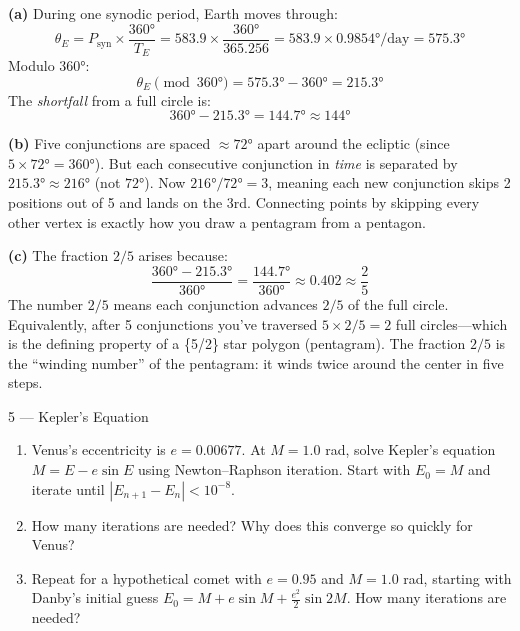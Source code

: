 \documentclass[11pt,letterpaper]{article}
\begin{document}
\begin{solution}
\textbf{(a)} During one synodic period, Earth moves through:
\[
  \theta_E = P_\text{syn} \times \frac{360°}{T_E}
  = 583.9 \times \frac{360°}{365.256}
  = 583.9 \times 0.9854°/\text{day}
  = 575.3°
\]
Modulo $360°$:
\[
  \theta_E \pmod{360°} = 575.3° - 360° = \boxed{215.3°}
\]
The \textit{shortfall} from a full circle is:
\[
  360° - 215.3° = \boxed{144.7° \approx 144°}
\]

\textbf{(b)} Five conjunctions are spaced $\approx 72°$ apart
around the ecliptic (since $5 \times 72° = 360°$). But each
consecutive conjunction in \textit{time} is separated by
$215.3° \approx 216°$ (not $72°$). Now $216° / 72° = 3$, meaning
each new conjunction skips 2 positions out of 5 and lands on the
3rd. Connecting points by skipping every other vertex is exactly
how you draw a pentagram from a pentagon.

\textbf{(c)} The fraction $2/5$ arises because:
\[
  \frac{360° - 215.3°}{360°} = \frac{144.7°}{360°} \approx 0.402
  \approx \frac{2}{5}
\]
The number $2/5$ means each conjunction advances $2/5$ of the full
circle. Equivalently, after 5 conjunctions you've traversed
$5 \times 2/5 = 2$ full circles—which is the defining property of
a \{5/2\} star polygon (pentagram). The fraction $\boxed{2/5}$ is
the ``winding number'' of the pentagram: it winds twice around the
center in five steps.
\end{solution}

\vspace{0.5cm}

\begin{problem}{5 — Kepler's Equation}
\begin{enumerate}[label=(\alph*)]
  \item Venus's eccentricity is $e = 0.00677$. At $M = 1.0$ rad,
    solve Kepler's equation $M = E - e\sin E$ using Newton–Raphson
    iteration. Start with $E_0 = M$ and iterate until
    $|E_{n+1} - E_n| < 10^{-8}$.
  \item How many iterations are needed? Why does this converge so
    quickly for Venus?
  \item Repeat for a hypothetical comet with $e = 0.95$ and
    $M = 1.0$ rad, starting with Danby's initial guess
    $E_0 = M + e\sin M + \frac{e^2}{2}\sin 2M$. How many
    iterations are needed?
\end{enumerate}
\end{problem}
\end{document}
